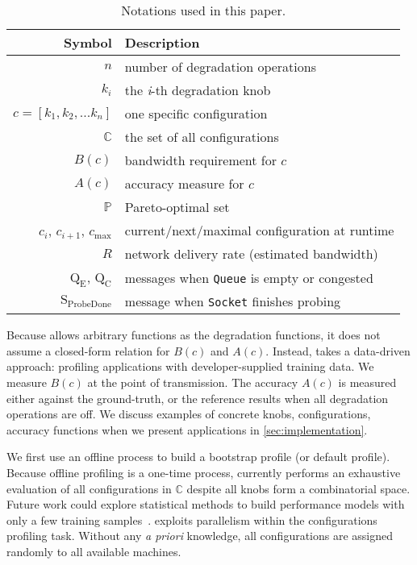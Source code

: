 \begin{table}
  \footnotesize
  \centering
  \begin{tabular}{r l}
    \toprule
    \textbf{Symbol} & \textbf{Description} \\
    \midrule
    $n$ & number of degradation operations \\
    $k_i$ & the \textit{i}-th degradation knob \\
    $c = [k_{1}, k_{2}, ... k_{n}]$ & one specific configuration \\
    $\mathbb{C}$ & the set of all configurations \\
    \midrule
    $B(c)$ & bandwidth requirement for $c$ \\
    $A(c)$ & accuracy measure for $c$ \\
    $\mathbb{P}$ & Pareto-optimal set \\
    \midrule
    $c_i$, $c_{i+1}$, $c_{\max}$ & current/next/maximal configuration at runtime \\
    $R$ & network delivery rate (estimated bandwidth) \\
    $\text{Q}_\text{E}$, $\text{Q}_\text{C}$ & messages when \texttt{Queue} is empty or congested \\
    $\text{S}_\text{ProbeDone}$ & message when \texttt{Socket} finishes probing \\
    \bottomrule
  \end{tabular}
  \caption{Notations used in this paper.}
  \label{tab:notations}
\end{table}

Because \sysname{} allows arbitrary functions as the degradation functions, it
does not assume a closed-form relation for $B(c)$ and $A(c)$. Instead,
\sysname{} takes a data-driven approach: profiling applications with
developer-supplied training data.  We measure $B(c)$ at the point of
transmission. The accuracy $A(c)$ is measured either against the ground-truth,
or the reference results when all degradation operations are off.  We discuss
examples of concrete knobs, configurations, accuracy functions when we present
applications in \autoref{sec:implementation}.

 We first use an offline process to build a bootstrap
profile (or default profile). Because offline profiling is a one-time process,
\sysname{} currently performs an exhaustive evaluation of all configurations in
$\mathbb{C}$ despite all knobs form a combinatorial space. Future work could
explore statistical methods to build performance models with only a few training
samples~\cite{venkataraman2016ernest, alipourfard2017cherrypick}. \sysname{}
exploits parallelism within the configurations profiling task. Without any
\textit{a priori} knowledge, all configurations are assigned randomly to all
available machines.

